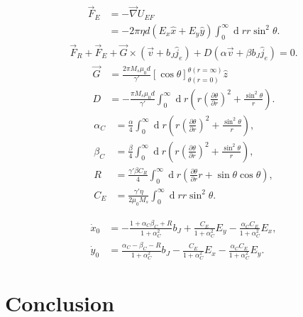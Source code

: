 \documentclass[12pt, a4paper, twoside, openright]{article}		%
\let\oldsection\section
\def\section{\cleardoublepage\oldsection}
\renewcommand{\d}[1]{\ensuremath{\operatorname{d}\!{#1}}}
\numberwithin{equation}{section}
\begin{document}
\begin{align}
\vec{F}_E &= -\vec{\nabla}U_{EF} \\
&= -2\pi \eta d \left(E_x \hat{x} + E_y \hat{y}\right) \int_0^{\infty}\d r r \sin^2\theta.
\end{align}
\begin{align}
\vec{F}_R+\vec{F}_E + \vec{G} \times\left(\vec{v}+b_J\hat{j}_e\right) + D\left(\alpha\vec{v}+\beta b_J \hat{j}_e\right) = 0.
\end{align}
\begin{align}
\vec{G} &= \frac{2\pi M_s\mu_0 d}{\gamma'}\left[\cos\theta\right]_{\theta(r=0)}^{\theta(r=\infty)} \hat{z}\\
D &= - \frac{\pi M_s \mu_0 d}{\gamma '} \int_0^{\infty} \d r \left(r\left(\frac{\partial \theta}{\partial r}\right)^2+\frac{\sin^2\theta}{r}\right).
\end{align}
\begin{align}
\alpha_C &= \frac{\alpha}{4} \int_0^{\infty} \d r \left(r\left(\frac{\partial \theta}{\partial r}\right)^2+\frac{\sin^2\theta}{r}\right), \\
\beta_C &=\frac{\beta}{4} \int_0^{\infty} \d r \left(r\left(\frac{\partial \theta}{\partial r}\right)^2+\frac{\sin^2\theta}{r}\right), \\
R &= \frac{\gamma'\beta C_R}{4} \int_0^{\infty} \d r \left(\frac{\partial \theta}{\partial r} r + \sin\theta\cos\theta \right), \\
C_E &= \frac{\gamma' \eta}{2\mu_0 M_s}\int_0^{\infty}\d r r\sin^2\theta.
\end{align}

\begin{align}
\dot{x}_0 &= - \frac{1+\alpha_C\beta_C + R}{1+\alpha_C^2}b_J + \frac{C_E}{1+\alpha_C^2}E_y - \frac{\alpha_C C_E}{1+\alpha_C^2}E_x, \\
\dot{y}_0 &= \frac{\alpha_C-\beta_C - R}{1+\alpha_C^2}b_J - \frac{C_E}{1+\alpha_C^2}E_x - \frac{\alpha_C C_E}{1+\alpha_C^2}E_y.
\end{align}
\section{Conclusion}



\end{document}
